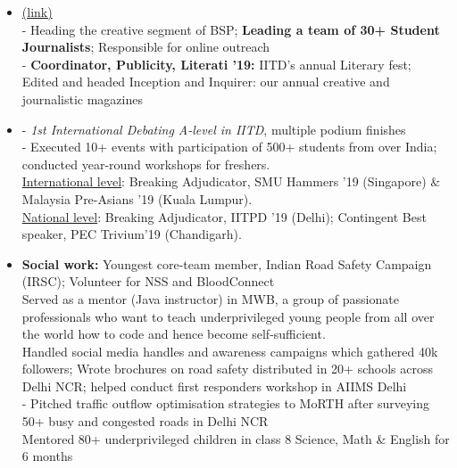 \documentclass{article}
\begin{document}
\begin{itemize}
    \setlength\itemsep{0em}
    
    \item \underline{} \href{http://bsp.iitd.ac.in/}{(link)}\\
    - Heading the creative segment of BSP; \textbf{Leading a team of 30+ Student Journalists}; Responsible for online outreach \\
    - \textbf{Coordinator, Publicity, Literati '19:} IITD's annual Literary fest; Edited and headed Inception and Inquirer: our annual creative and journalistic magazines
    
    \item \underline{} - \textit{1st International Debating A-level in IITD}, multiple podium finishes \\
    - Executed 10+ events with participation of 500+ students from over India; conducted year-round workshops for freshers.\\
    \underline{International level}: Breaking Adjudicator, SMU Hammers '19 (Singapore) \& Malaysia Pre-Asians '19 (Kuala Lumpur).\\
    \underline{National level}: Breaking Adjudicator, IITPD '19 (Delhi); Contingent Best speaker, PEC Trivium'19 (Chandigarh).
    
    \item \textbf{Social work:} Youngest core-team member, Indian Road Safety Campaign (IRSC); Volunteer for NSS and BloodConnect\\
    \underline{} Served as a mentor (Java instructor) in MWB, a group of passionate professionals who want to teach underprivileged young people from all over the world how to code and hence become self-sufficient.\\
    \underline{} Handled social media handles and awareness campaigns which gathered 40k followers; Wrote brochures on road safety distributed in 20+ schools across Delhi NCR; helped conduct first responders workshop in AIIMS Delhi \\
    - Pitched traffic outflow optimisation strategies to MoRTH after surveying 50+ busy and congested roads in Delhi NCR\\
    \underline{} Mentored 80+ underprivileged children in class 8 Science, Math \& English for 6 months


\end{itemize}
\end{document}
